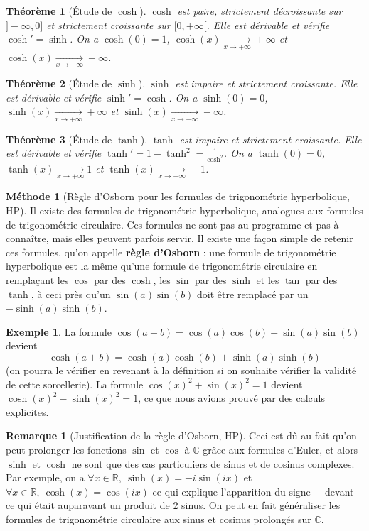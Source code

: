\documentclass[french]{book}
\newcommand{\R}{\mathbb{R}}
\newcommand{\C}{\mathbb{C}}
\theoremstyle{plain}
\newtheorem{thm}{Théorème}[chapter]
\theoremstyle{definition}
\newtheorem{exa}{Exemple}[chapter]
\newtheorem{rmq}{Remarque}[chapter]
\newtheorem{met}{Méthode}[chapter]
\theoremstyle{remark}
\begin{document}
\begin{thm}[Étude de $\cosh$]
	$\cosh$ est paire, strictement décroissante sur $]-\infty,0]$ et strictement croissante sur $[0,+\infty[$. Elle est dérivable et vérifie $\cosh'=\sinh$. On a $\cosh(0)=1$, $\displaystyle\cosh(x)\xrightarrow[x\to +\infty]{}+\infty$ et $\displaystyle\cosh(x)\xrightarrow[x\to -\infty]{}+\infty$.
\end{thm}
\begin{thm}[Étude de $\sinh$]
	$\sinh$ est impaire et strictement croissante. Elle est dérivable et vérifie $\sinh'=\cosh$. On a $\sinh(0)=0$, $\displaystyle\sinh(x)\xrightarrow[x\to +\infty]{}+\infty$ et $\displaystyle\sinh(x)\xrightarrow[x\to -\infty]{}-\infty$.
\end{thm}
\begin{thm}[Étude de $\tanh$]
	$\tanh$ est impaire et strictement croissante. Elle est dérivable et vérifie $\tanh'=1-\tanh^2=\displaystyle\frac{1}{\cosh^2}$. On a $\tanh(0)=0$, $\displaystyle\tanh(x)\xrightarrow[x\to +\infty]{}1$ et $\displaystyle\tanh(x)\xrightarrow[x\to -\infty]{}-1$.
\end{thm}
\begin{met}[Règle d'Osborn pour les formules de trigonométrie hyperbolique, HP]
	Il existe des formules de trigonométrie hyperbolique, analogues aux formules de trigonométrie circulaire. Ces formules ne sont pas au programme et pas à connaître, mais elles peuvent parfois servir. Il existe une façon simple de retenir ces formules, qu'on appelle \textbf{règle d'Osborn} : une formule de trigonométrie hyperbolique est la même qu'une formule de trigonométrie circulaire en remplaçant les $\cos$ par des $\cosh$, les $\sin$ par des $\sinh$ et les $\tan$ par des $\tanh$, à ceci près qu'un $\sin(a)\sin(b)$ doit être remplacé par un $-\sinh(a)\sinh(b)$.
\end{met}
\begin{exa}
	La formule $\cos(a+b)=\cos(a)\cos(b)-\sin(a)\sin(b)$ devient $$\cosh(a+b)=\cosh(a)\cosh(b)+\sinh(a)\sinh(b)$$ (on pourra le vérifier en revenant à la définition si on souhaite vérifier la validité de cette sorcellerie). La formule $\cos(x)^2+\sin(x)^2=1$ devient $\cosh(x)^2-\sinh(x)^2=1$, ce que nous avions prouvé par des calculs explicites.
\end{exa}
\begin{rmq}[Justification de la règle d'Osborn, HP]
	Ceci est dû au fait qu'on peut prolonger les fonctions $\sin$ et $\cos$ à $\C$ grâce aux formules d'Euler, et alors $\sinh$ et $\cosh$ ne sont que des cas particuliers de sinus et de cosinus complexes. Par exemple, on a $\forall x\in\R,\ \sinh(x)=-i\sin(ix)$ et $\forall x\in\R,\ \cosh(x)=\cos(ix)$ ce qui explique l'apparition du signe $-$ devant ce qui était auparavant un produit de 2 sinus. On peut en fait généraliser les formules de trigonométrie circulaire aux sinus et cosinus prolongés sur $\C$.
\end{rmq}
\end{document}
